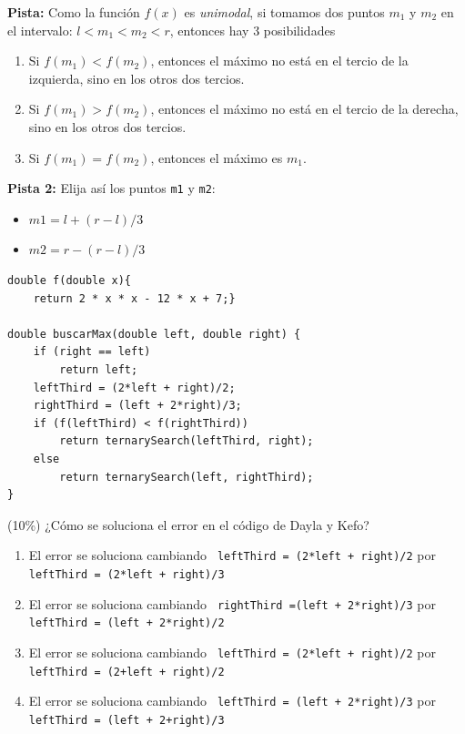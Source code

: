\documentclass[twocolumn]{article}
\begin{document}
\textbf{Pista: } Como la función $f(x)$ es \textit{unimodal}, si tomamos dos puntos $m_1$ y $m_2$ en el intervalo: $l < m_1 < m_2 < r$, entonces hay 3 posibilidades

\begin{enumerate}
\item Si $f(m_1) < f(m_2)$, entonces el máximo no está en el tercio de la izquierda, sino en los otros dos tercios.
\item Si $f(m_1) > f(m_2)$, entonces el máximo no está en el tercio de la derecha, sino en los otros dos tercios.
\item Si $f(m_1) = f(m_2)$, entonces el máximo es $m_1$.\\
\end{enumerate}

\textbf{Pista 2: } Elija así los puntos \texttt{m1} y \texttt{m2}: \\

\begin{itemize}
\item $m1 = l + (r-l)/3$
\item $m2 = r - (r-l)/3$
\end{itemize}

{\small
\begin{verbatim}
double f(double x){
    return 2 * x * x - 12 * x + 7;}

double buscarMax(double left, double right) {
    if (right == left) 
        return left; 
    leftThird = (2*left + right)/2;
    rightThird = (left + 2*right)/3;
    if (f(leftThird) < f(rightThird))
        return ternarySearch(leftThird, right); 
    else
        return ternarySearch(left, rightThird);
} 
\end{verbatim}
}

 (10\%) ¿Cómo se soluciona el error en el código de Dayla y Kefo?

\begin{enumerate}[label=\Alph*]
\item El error se soluciona cambiando \texttt{ leftThird = (2*left + right)/2} por 
\texttt{ leftThird = (2*left + right)/3}\\
\item El error se soluciona cambiando \texttt{ rightThird =(left + 2*right)/3} por
\texttt{ leftThird = (left + 2*right)/2}\\
\item El error se soluciona cambiando \texttt{ leftThird = (2*left + right)/2} por
\texttt{ leftThird = (2+left + right)/2}\\
\item El error se soluciona cambiando \texttt{ leftThird = (left + 2*right)/3} por
\texttt{ leftThird = (left + 2+right)/3}\\
\end{enumerate} 
\end{document}
